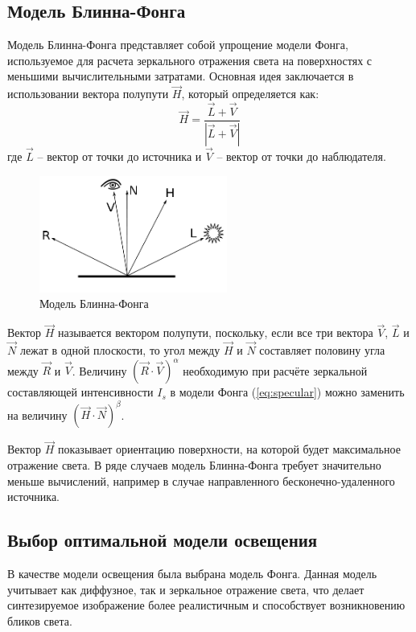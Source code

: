 \subsection{Модель Блинна-Фонга}
Модель Блинна-Фонга представляет собой упрощение модели Фонга, используемое для расчета зеркального отражения света на поверхностях с меньшими вычислительными затратами. Основная идея заключается в использовании вектора полупути $\vec{H}$, который определяется как:
\begin{equation}
	\vec{H} = \frac{\vec{L} + \vec{V}}{|\vec{L} + \vec{V}|}
\end{equation}
где  $\vec{L}$ -- вектор от точки до источника и $\vec{V}$ -- вектор от точки до наблюдателя. 

\begin{figure}[h] 
	\centering
	\includegraphics[width=0.55\textwidth]{images/blinn-phong.png}
	\caption{Модель Блинна-Фонга} 
	\label{fig:blinn-phong} 
\end{figure}

Вектор $\vec{H}$ называется вектором полупути, поскольку, если все три вектора $\vec{V}$, $\vec{L}$ и $\vec{N}$ лежат в одной плоскости, то угол между $\vec{H}$ и $\vec{N}$ составляет половину угла между $\vec{R}$ и $\vec{V}$. Величину $(\vec{R} \cdot \vec{V})^{\alpha}$ необходимую при расчёте зеркальной составляющей интенсивности $I_s$ в модели Фонга (\ref{eq:specular}) можно заменить на величину $(\vec{H} \cdot \vec{N})^{\beta}$.

Вектор $\vec{H}$ показывает ориентацию поверхности, на которой будет максимальное отражение света. В ряде случаев модель Блинна-Фонга требует значительно меньше вычислений, например в случае направленного бесконечно-удаленного источника.

\subsection{Выбор оптимальной модели освещения}

В качестве модели освещения была выбрана модель Фонга. Данная модель учитывает как диффузное, так и зеркальное отражение света, что делает синтезируемое изображение более реалистичным и способствует возникновению бликов света.

